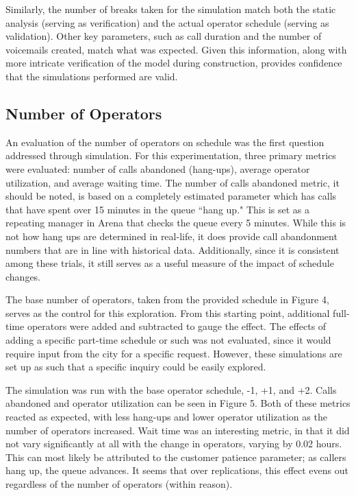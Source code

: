 \documentclass[12pt]{article}
\begin{document}
	  \par
	  
	  Similarly, the number of breaks taken for the simulation match both the static analysis (serving as verification) and the actual operator schedule (serving as validation).  Other key parameters, such as call duration and the number of voicemails created, match what was expected.  Given this information, along with more intricate verification of the model during construction, provides confidence that the simulations performed are valid.
	  
	  
	\subsection{Number of Operators}
	
	An evaluation of the number of operators on schedule was the first question addressed through simulation.  For this experimentation, three primary metrics were evaluated:  number of calls abandoned (hang-ups), average operator utilization, and average waiting time.  The number of calls abandoned metric, it should be noted, is based on a completely estimated parameter which has calls that have spent over 15 minutes in the queue ``hang up."  This is set as a repeating manager in Arena that checks the queue every 5 minutes.  While this is not how hang ups are determined in real-life, it does provide call abandonment numbers that are in line with historical data.  Additionally, since it is consistent among these trials, it still serves as a useful measure of the impact of schedule changes.
	
	\par
	
	The base number of operators, taken from the provided schedule in Figure 4, serves as the control for this exploration.  From this starting point, additional full-time operators were added and subtracted to gauge the effect.  The effects of adding a specific part-time schedule or such was not evaluated, since it would require input from the city for a specific request.  However, these simulations are set up as such that a specific inquiry could be easily explored.
	
	\par
	
	The simulation was run with the base operator schedule, -1, +1, and +2.  Calls abandoned and operator utilization can be seen in Figure 5.  Both of these metrics reacted as expected, with less hang-ups and lower operator utilization as the number of operators increased.  Wait time was an interesting metric, in that it did not vary significantly at all with the change in operators, varying by 0.02 hours.  This can most likely be attributed to the customer patience parameter; as callers hang up, the queue advances.  It seems that over replications, this effect evens out regardless of the number of operators (within reason).
	
\end{document}
